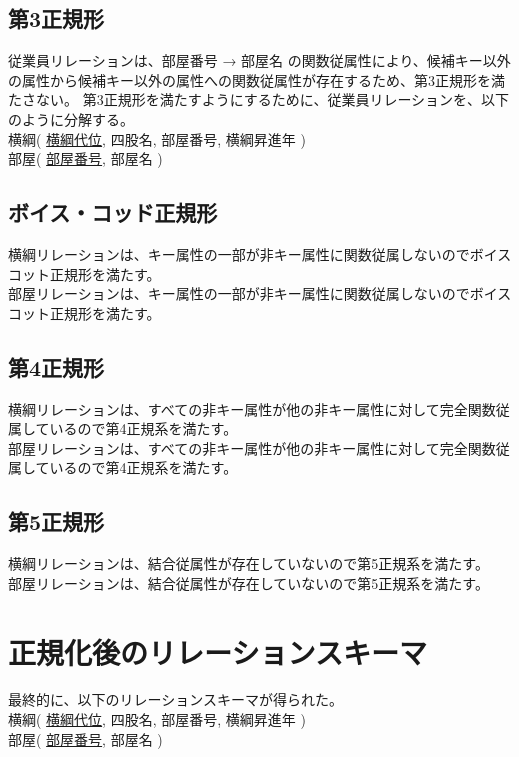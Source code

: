 \documentclass[a4j,12pt]{jreport}
\begin{document}
\subsection{第3正規形}
従業員リレーションは、部屋番号 → 部屋名 の関数従属性により、候補キー以外の属性から候補キー以外の属性への関数従属性が存在するため、第3正規形を満たさない。
第3正規形を満たすようにするために、従業員リレーションを、以下のように分解する。\\

横綱( \underline{横綱代位}, 四股名, 部屋番号, 横綱昇進年 )\\
部屋( \underline{部屋番号}, 部屋名 )\\

\subsection{ボイス・コッド正規形}
横綱リレーションは、キー属性の一部が非キー属性に関数従属しないのでボイスコット正規形を満たす。\\
部屋リレーションは、キー属性の一部が非キー属性に関数従属しないのでボイスコット正規形を満たす。\\


\subsection{第4正規形}
横綱リレーションは、すべての非キー属性が他の非キー属性に対して完全関数従属しているので第4正規系を満たす。\\
部屋リレーションは、すべての非キー属性が他の非キー属性に対して完全関数従属しているので第4正規系を満たす。\\


\subsection{第5正規形}
横綱リレーションは、結合従属性が存在していないので第5正規系を満たす。\\
部屋リレーションは、結合従属性が存在していないので第5正規系を満たす。\\

\section{正規化後のリレーションスキーマ}
最終的に、以下のリレーションスキーマが得られた。\\

横綱( \underline{横綱代位}, 四股名, 部屋番号, 横綱昇進年 )\\
部屋( \underline{部屋番号}, 部屋名 )\\
\end{document}
